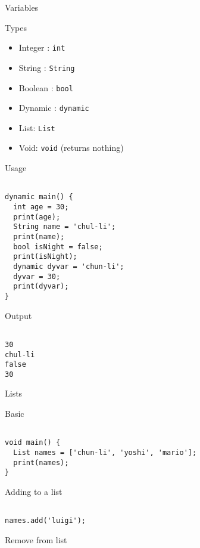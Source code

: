 \documentclass[presentation]{beamer}
\begin{document}
\begin{frame}[label={sec:orgc87552c},fragile]{Variables}
 \begin{block}{Types}
\begin{itemize}
\item Integer : \texttt{int}
\item String : \texttt{String}
\item Boolean : \texttt{bool}
\item Dynamic : \texttt{dynamic}
\item List: \texttt{List}
\item Void: \texttt{void} (returns nothing)
\end{itemize}
\end{block}

\begin{block}{Usage}
\begin{verbatim}

dynamic main() {
  int age = 30;
  print(age);
  String name = 'chul-li';
  print(name);
  bool isNight = false;
  print(isNight);
  dynamic dyvar = 'chun-li';
  dyvar = 30;
  print(dyvar);
}

\end{verbatim}

\begin{block}{Output}
\begin{verbatim}

30
chul-li
false
30

\end{verbatim}
\end{block}
\end{block}

\begin{block}{Lists}
\begin{block}{Basic}
\begin{verbatim}

void main() {
  List names = ['chun-li', 'yoshi', 'mario'];
  print(names);
}

\end{verbatim}
\end{block}

\begin{block}{Adding to a list}
\begin{verbatim}

names.add('luigi');

\end{verbatim}
\end{block}

\begin{block}{Remove from list}
\begin{verbatim}


\end{verbatim}
\end{block}
\end{block}
\end{frame}
\end{document}
